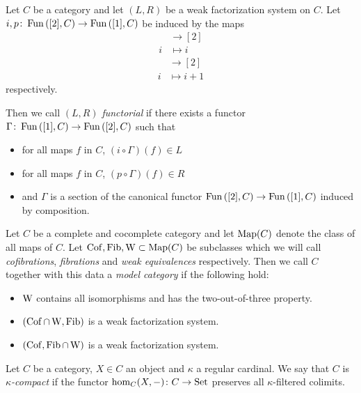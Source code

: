 \begin{definition}
    Let $C$ be a category and let $(L,R)$ be a weak factorization system on $C$.
    Let $i,p\colon\operatorname{Fun}\left([2],C\right)\to\operatorname{Fun}\left([1],C\right)$ be induced by the maps
    \begin{align*}
        [1]&\to[2]\\
        i&\mapsto i
    \end{align*}
    \begin{align*}
        [1]&\to[2]\\
        i&\mapsto i+1
    \end{align*}
    respectively.

    Then we call $(L,R)$ \emph{functorial} if there exists a functor $\Gamma\colon\operatorname{Fun}\left([1],C\right)\to\operatorname{Fun}\left([2],C\right)$ such that
    \begin{itemize}
        \item for all maps $f$ in $C$, $(i\circ\Gamma)(f)\in L$
        \item for all maps $f$ in $C$, $(p\circ\Gamma)(f)\in R$
        \item and $\Gamma$ is a section of the canonical functor $\operatorname{Fun}\left([2],C\right)\to\operatorname{Fun}\left([1],C\right)$ induced by composition.
    \end{itemize}
\end{definition}
\begin{definition}
    Let $C$ be a complete and cocomplete category and let $\operatorname{Map}(C)$ denote the class of all maps of $C$.
    Let $\operatorname{Cof},\operatorname{Fib},\operatorname{W}\subset\operatorname{Map}(C)$ be subclasses which we will call \emph{cofibrations}, \emph{fibrations} and \emph{weak equivalences} respectively.
    Then we call $C$ together with this data a \emph{model category} if the following hold:
    \begin{itemize}
        \item $\operatorname{W}$ contains all isomorphisms and has the two-out-of-three property.
        \item $(\operatorname{Cof}\cap\operatorname{W},\operatorname{Fib})$ is a weak factorization system.
        \item $(\operatorname{Cof},\operatorname{Fib}\cap\operatorname{W})$ is a weak factorization system.
    \end{itemize}
\end{definition}
\begin{definition}
    Let $C$ be a category, $X\in C$ an object and $\kappa$ a regular cardinal.
    We say that $C$ is \emph{$\kappa$-compact} if the functor $\hom_C(X,-)\colon C\to\operatorname{Set}$ preserves all $\kappa$-filtered colimits.
\end{definition}
